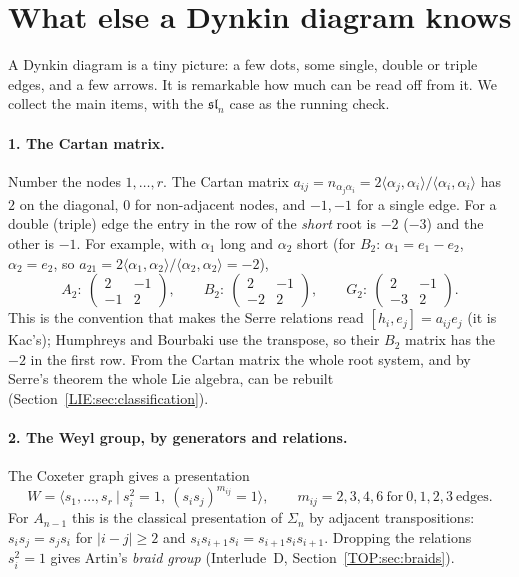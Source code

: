 \documentclass[11pt,openany]{book}
\theoremstyle{plain}
\theoremstyle{definition}
\theoremstyle{remark}
\newcommand{\abs}[1]{\left\lvert #1 \right\rvert}
\newcommand{\ip}[2]{\langle #1, #2\rangle}
\begin{document}
\section{What else a Dynkin diagram knows}
\label{LIE:sec:readoff}

A Dynkin diagram is a tiny picture: a few dots, some single, double or triple edges, and a few arrows.
It is remarkable how much can be read off from it. We collect the main items, with the
$\mathfrak{sl}_n$ case as the running check.

\paragraph{1. The Cartan matrix.} Number the nodes $1,\dots,r$. The Cartan matrix
$a_{ij}=n_{\alpha_j\alpha_i}=2\ip{\alpha_j}{\alpha_i}/\ip{\alpha_i}{\alpha_i}$ has $2$ on the diagonal,
$0$ for non-adjacent nodes, and $-1,-1$ for a single edge. For a double (triple) edge the entry in the
row of the \emph{short} root is $-2$ ($-3$) and the other is $-1$. For example, with $\alpha_1$ long and
$\alpha_2$ short (for $B_2$: $\alpha_1=e_1-e_2$, $\alpha_2=e_2$, so $a_{21}=2\ip{\alpha_1}{\alpha_2}/\ip{\alpha_2}{\alpha_2}=-2$),
\[
  A_2:\ \begin{pmatrix}2&-1\\-1&2\end{pmatrix},\qquad
  B_2:\ \begin{pmatrix}2&-1\\-2&2\end{pmatrix},\qquad
  G_2:\ \begin{pmatrix}2&-1\\-3&2\end{pmatrix}.
\]
This is the convention that makes the Serre relations read $[h_i,e_j]=a_{ij}e_j$ (it is Kac's);
Humphreys and Bourbaki use the transpose, so their $B_2$ matrix has the $-2$ in the first row. From
the Cartan matrix the whole root system, and by Serre's theorem the whole Lie algebra, can be
rebuilt (Section~\ref{LIE:sec:classification}).

\paragraph{2. The Weyl group, by generators and relations.} The Coxeter graph gives a presentation
\[
  W=\big\langle s_1,\dots,s_r\ \big|\ s_i^2=1,\ (s_is_j)^{m_{ij}}=1\big\rangle,\qquad
  m_{ij}=2,3,4,6\ \text{for}\ 0,1,2,3\ \text{edges}.
\]
For $A_{n-1}$ this is the classical presentation of $\Sigma_n$ by adjacent transpositions:
$s_is_j=s_js_i$ for $\abs{i-j}\ge2$ and $s_is_{i+1}s_i=s_{i+1}s_is_{i+1}$. Dropping the relations
$s_i^2=1$ gives Artin's \emph{braid group} (Interlude~D, Section~\ref{TOP:sec:braids}).
\end{document}
